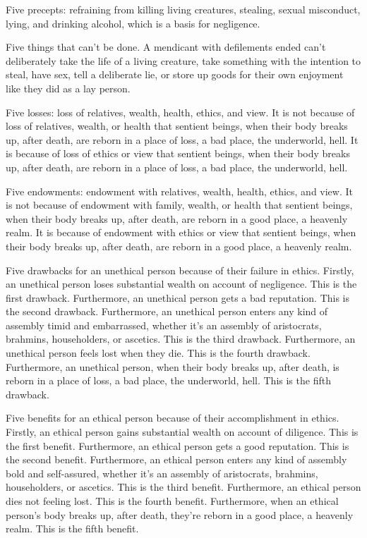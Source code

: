 \documentclass[12pt,openany]{book}%
\begin{document}
Five precepts: refraining from killing living creatures, stealing, sexual misconduct, lying, and drinking alcohol, which is a basis for negligence. 

Five things that can’t be done. A mendicant with defilements ended can’t deliberately take the life of a living creature, take something with the intention to steal, have sex, tell a deliberate lie, or store up goods for their own enjoyment like they did as a lay person. 

Five losses: loss of relatives, wealth, health, ethics, and view. It is not because of loss of relatives, wealth, or health that sentient beings, when their body breaks up, after death, are reborn in a place of loss, a bad place, the underworld, hell. It is because of loss of ethics or view that sentient beings, when their body breaks up, after death, are reborn in a place of loss, a bad place, the underworld, hell. 

Five endowments: endowment with relatives, wealth, health, ethics, and view. It is not because of endowment with family, wealth, or health that sentient beings, when their body breaks up, after death, are reborn in a good place, a heavenly realm. It is because of endowment with ethics or view that sentient beings, when their body breaks up, after death, are reborn in a good place, a heavenly realm. 

Five drawbacks for an unethical person because of their failure in ethics. Firstly, an unethical person loses substantial wealth on account of negligence. This is the first drawback. Furthermore, an unethical person gets a bad reputation. This is the second drawback. Furthermore, an unethical person enters any kind of assembly timid and embarrassed, whether it’s an assembly of aristocrats, brahmins, householders, or ascetics. This is the third drawback. Furthermore, an unethical person feels lost when they die. This is the fourth drawback. Furthermore, an unethical person, when their body breaks up, after death, is reborn in a place of loss, a bad place, the underworld, hell. This is the fifth drawback. 

Five benefits for an ethical person because of their accomplishment in ethics. Firstly, an ethical person gains substantial wealth on account of diligence. This is the first benefit. Furthermore, an ethical person gets a good reputation. This is the second benefit. Furthermore, an ethical person enters any kind of assembly bold and self-assured, whether it’s an assembly of aristocrats, brahmins, householders, or ascetics. This is the third benefit. Furthermore, an ethical person dies not feeling lost. This is the fourth benefit. Furthermore, when an ethical person’s body breaks up, after death, they’re reborn in a good place, a heavenly realm. This is the fifth benefit. 
\end{document}
